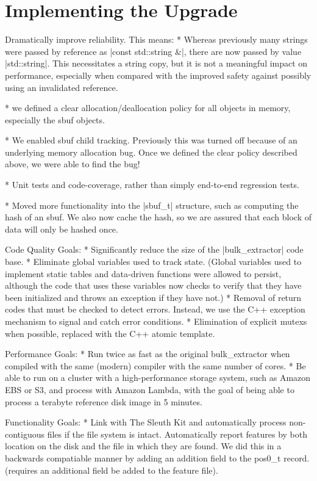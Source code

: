 \documentclass[5p]{elsarticle}
\begin{document}
\section{Implementing the Upgrade}

Dramatically improve reliability. This means:
* Whereas previously many strings were passed by reference as |const std::string &|,
there are now passed by value |std::string|. This necessitates a
string copy, but it is not a meaningful impact on performance,
especially when compared with the improved safety against possibly
using an invalidated reference.

* we defined a clear allocation/deallocation policy for all
objects in memory, especially the sbuf objects.

* We enabled sbuf child tracking. Previously this was turned off
because of an underlying memory allocation bug. Once we defined the
clear policy described above, we were able to find the bug!

* Unit tests and code-coverage, rather than simply end-to-end
regression tests.

* Moved more functionality into the |sbuf_t| structure, such as
computing the hash of an sbuf. We also now cache the hash, so we are
assured that each block of data will only be hashed once.


Code Quality Goals:
* Significantly reduce the size of the |bulk_extractor| code base.
* Eliminate global variables used to track state. (Global variables
used to implement static tables and data-driven functions were allowed
to persist, although the code that uses these variables now checks to
verify that they have been initialized and throws an exception if they
have not.)
* Removal of return codes that must be checked to detect
errors. Instead, we use the C++ exception mechanism to signal and
catch error conditions.
* Elimination of explicit mutexs when possible, replaced with the C++
atomic template.

Performance Goals:
* Run twice as fast as the original bulk\_extractor when compiled with
the same (modern) compiler with the same number of cores.
* Be able to run on a cluster with a high-performance storage system,
such as Amazon EBS or S3, and process with Amazon Lambda, with the
goal of being able to process a terabyte reference disk image in 5
minutes.

Functionality Goals:
* Link with The Sleuth Kit and automatically process non-contiguous
files if the file system is intact. Automatically report features by
both location on the disk and the file in which they are found. We did
this in a backwards compatiable manner by adding an addition field to
the pos0\_t record.
(requires an additional field be added to the feature file).
\end{document}

